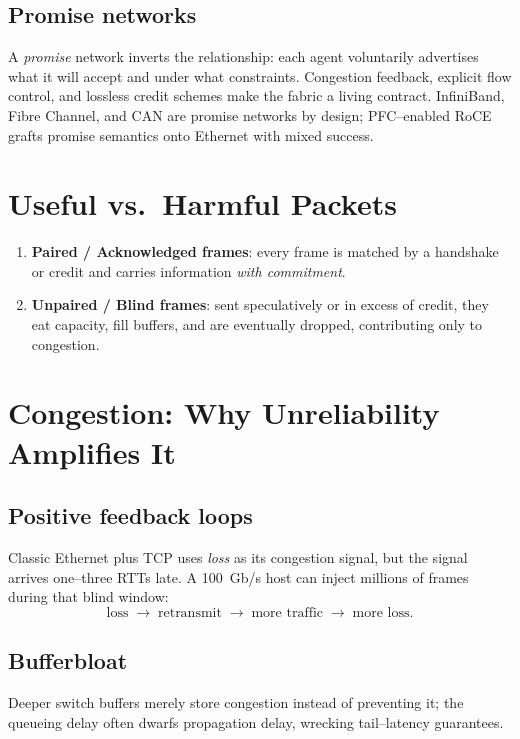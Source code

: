 \documentclass[../HFT-main.tex]{subfiles}
\begin{document}
\subsection{Promise networks}
A \emph{promise} network inverts the relationship: each agent voluntarily
advertises what it will accept and under what constraints.  Congestion
feedback, explicit flow control, and lossless credit schemes make the
fabric a living contract.  InfiniBand, Fibre Channel, and CAN are promise
networks by design; PFC--enabled RoCE grafts promise semantics onto
Ethernet with mixed success.

\section{Useful vs.\ Harmful Packets}

\begin{enumerate}
  \item \textbf{Paired / Acknowledged frames}: every frame is matched by a
  handshake or credit and carries information \emph{with commitment}.
  \item \textbf{Unpaired / Blind frames}: sent speculatively or in excess of
  credit, they eat capacity, fill buffers, and are eventually dropped,
  contributing only to congestion.
\end{enumerate}

\section{Congestion: Why Unreliability Amplifies It}

\subsection{Positive feedback loops}
Classic Ethernet plus TCP uses \emph{loss} as its congestion signal, but
the signal arrives one--three RTTs late.  A 100~Gb/s host can inject
millions of frames during that blind window:
\[
  \text{loss} \;\longrightarrow\; \text{retransmit} \;\longrightarrow\;
  \text{more traffic} \;\longrightarrow\; \text{more loss}.
\]

\subsection{Bufferbloat}
Deeper switch buffers merely store congestion instead of preventing it; the
queueing delay often dwarfs propagation delay, wrecking tail--latency
guarantees.
\end{document}
